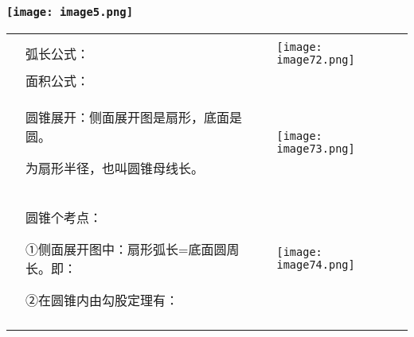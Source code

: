 \hypertarget{ux5b66ux79d1ux7f51www.zxxk.com--ux6559ux80b2ux8d44ux6e90ux95e8ux6237ux63d0ux4f9bux8bd5ux9898ux8bd5ux5377ux6559ux6848ux8bfeux4ef6ux6559ux5b66ux8bbaux6587ux7d20ux6750ux7b49ux5404ux7c7bux6559ux5b66ux8d44ux6e90ux5e93ux4e0bux8f7dux8fd8ux6709ux5927ux91cfux4e30ux5bccux7684ux6559ux5b66ux8d44ux8baf-21}{%
\subsubsection{\texorpdfstring{\protect\texttt{[image: image5.png]}}{学科网(www.zxxk.com)-\/-教育资源门户，提供试题试卷、教案、课件、教学论文、素材等各类教学资源库下载，还有大量丰富的教学资讯！}}\label{ux5b66ux79d1ux7f51www.zxxk.com--ux6559ux80b2ux8d44ux6e90ux95e8ux6237ux63d0ux4f9bux8bd5ux9898ux8bd5ux5377ux6559ux6848ux8bfeux4ef6ux6559ux5b66ux8bbaux6587ux7d20ux6750ux7b49ux5404ux7c7bux6559ux5b66ux8d44ux6e90ux5e93ux4e0bux8f7dux8fd8ux6709ux5927ux91cfux4e30ux5bccux7684ux6559ux5b66ux8d44ux8baf-21}}

\begin{longtable}[]{@{}lll@{}}
\toprule
\endhead
& &\tabularnewline
& 弧长公式： &
\texttt{[image: image72.png]}\tabularnewline
& 面积公式： &\tabularnewline
\begin{minipage}[t]{0.30\columnwidth}\raggedright
\strut
\end{minipage} & \begin{minipage}[t]{0.30\columnwidth}\raggedright
圆锥展开：侧面展开图是扇形，底面是圆。

为扇形半径，也叫圆锥母线长。\strut
\end{minipage} & \begin{minipage}[t]{0.30\columnwidth}\raggedright
\texttt{[image: image73.png]}\strut
\end{minipage}\tabularnewline
\begin{minipage}[t]{0.30\columnwidth}\raggedright
\strut
\end{minipage} & \begin{minipage}[t]{0.30\columnwidth}\raggedright
圆锥个考点：

①侧面展开图中：扇形弧长=底面圆周长。即：

②在圆锥内由勾股定理有：\strut
\end{minipage} & \begin{minipage}[t]{0.30\columnwidth}\raggedright
\texttt{[image: image74.png]}\strut
\end{minipage}\tabularnewline
& &\tabularnewline
\bottomrule
\end{longtable}


